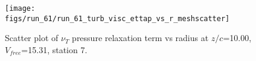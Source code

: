 \begin{figure}[H]
\centering
\texttt{[image: figs/run\_61/run\_61\_turb\_visc\_ettap\_vs\_r\_meshscatter]}
\caption{Scatter plot of $\nu_T$ pressure relaxation term vs radius at $z/c$=10.00, $V_{free}$=15.31, station 7.}
\label{fig:run_61_turb_visc_ettap_vs_r_meshscatter}
\end{figure}


